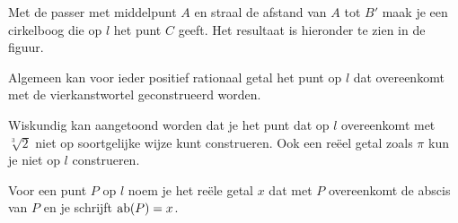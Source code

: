 \begin{center}
		
\end{center}

Met de passer met middelpunt $A$ en straal de afstand van $A$ tot $B'$ maak je een cirkelboog die op $l$ het punt $C$ geeft.
Het resultaat is hieronder te zien in de figuur.

\begin{center}
		
\end{center}




Algemeen kan voor ieder positief rationaal getal het punt op $l$ dat overeenkomt met de vierkanstwortel geconstrueerd worden.

Wiskundig kan aangetoond worden dat je het punt dat op $l$ overeenkomt met $\sqrt[3]{2}$ niet op soortgelijke wijze kunt construeren.
Ook een re\"eel getal zoals $\pi$ kun je niet op $l$ construeren.\vspace{2mm}

\begin{definitie}
	Voor een punt $P$ op $l$ noem je het re\"ele getal $x$ dat met $P$ overeenkomt de abscis van $P$ en je schrijft $\operatorname{ab} (P)=x$.
\end{definitie}

\begin{center}
		
\end{center}


